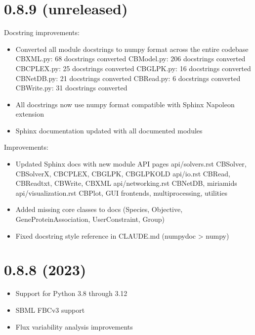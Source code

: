 \documentclass[letterpaper,12pt,english]{sphinxmanual}
\begin{document}
\section{0.8.9 (unreleased)}
\label{\detokenize{release-notes:unreleased}}
\sphinxAtStartPar
Docstring improvements:
\begin{itemize}
\item {} 
\sphinxAtStartPar
Converted all module docstrings to numpy format across the entire codebase
\sphinxhyphen{} CBXML.py: 68 docstrings converted
\sphinxhyphen{} CBModel.py: 206 docstrings converted
\sphinxhyphen{} CBCPLEX.py: 25 docstrings converted
\sphinxhyphen{} CBGLPK.py: 16 docstrings converted
\sphinxhyphen{} CBNetDB.py: 21 docstrings converted
\sphinxhyphen{} CBRead.py: 6 docstrings converted
\sphinxhyphen{} CBWrite.py: 31 docstrings converted

\item {} 
\sphinxAtStartPar
All docstrings now use numpy format compatible with Sphinx Napoleon extension

\item {} 
\sphinxAtStartPar
Sphinx documentation updated with all documented modules

\end{itemize}

\sphinxAtStartPar
Improvements:
\begin{itemize}
\item {} 
\sphinxAtStartPar
Updated Sphinx docs with new module API pages
\sphinxhyphen{} api/solvers.rst \sphinxhyphen{} CBSolver, CBSolverX, CBCPLEX, CBGLPK, CBGLPKOLD
\sphinxhyphen{} api/io.rst \sphinxhyphen{} CBRead, CBReadtxt, CBWrite, CBXML
\sphinxhyphen{} api/networking.rst \sphinxhyphen{} CBNetDB, miriamids
\sphinxhyphen{} api/visualization.rst \sphinxhyphen{} CBPlot, GUI frontends, multi\sphinxhyphen{}processing, utilities

\item {} 
\sphinxAtStartPar
Added missing core classes to docs (Species, Objective, GeneProteinAssociation, UserConstraint, Group)

\item {} 
\sphinxAtStartPar
Fixed docstring style reference in CLAUDE.md (numpydoc \sphinxhyphen{}\textgreater{} numpy)

\end{itemize}


\section{0.8.8 (2023)}
\label{\detokenize{release-notes:id1}}\begin{itemize}
\item {} 
\sphinxAtStartPar
Support for Python 3.8 through 3.12

\item {} 
\sphinxAtStartPar
SBML FBCv3 support

\item {} 
\sphinxAtStartPar
Flux variability analysis improvements

\end{itemize}
\end{document}
